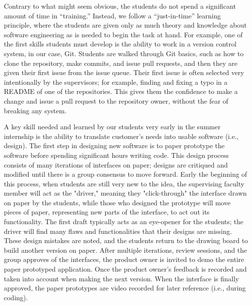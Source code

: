 Contrary to what might seem obvious, the students do not spend a significant amount of time in ``training.'' Instead, we follow a ``just-in-time'' learning principle, where the students are given only as much theory and knowledge about software engineering as is needed to begin the task at hand. For example, one of the first skills students must develop is the ability to work in a version control system, in our case, Git. Students are walked through Git basics, such as how to clone the repository, make commits, and issue pull requests, and then they are given their first issue from the issue queue. Their first issue is often selected very intentionally by the supervisors; for example, finding and fixing a typo in a README of one of the repositories. This gives them the confidence to make a change and issue a pull request to the repository owner, without the fear of breaking any system.


A key skill needed and learned by our students very early in the summer internship is the ability to translate customer's needs into usable software (i.e., design). The first step in designing new software is to paper prototype \cite{2003paperPrototype} the software before spending significant hours writing code. This design process consists of many iterations of interfaces on paper; designs are critiqued and modified until there is a group consensus to move forward. Early the beginning of this process, when students are still very new to the idea, the supervising faculty member will act as the "driver," meaning they "click-through" the interface drawn on paper by the students, while those who designed the prototype will move pieces of paper, representing new parts of the interface, to act out its functionality. The first draft typically acts as an eye-opener for the students; the driver will find many flaws and functionalities that their designs are missing. These design mistakes are noted, and the students return to the drawing board to build another version on paper. After multiple iterations, review sessions, and the group approves of the interfaces, the product owner is invited to demo the entire paper prototyped application. Once the product owner's feedback is recorded and taken into account when making the next version. When the interface is finally approved, the paper prototypes are video recorded for later reference (i.e., during coding).

